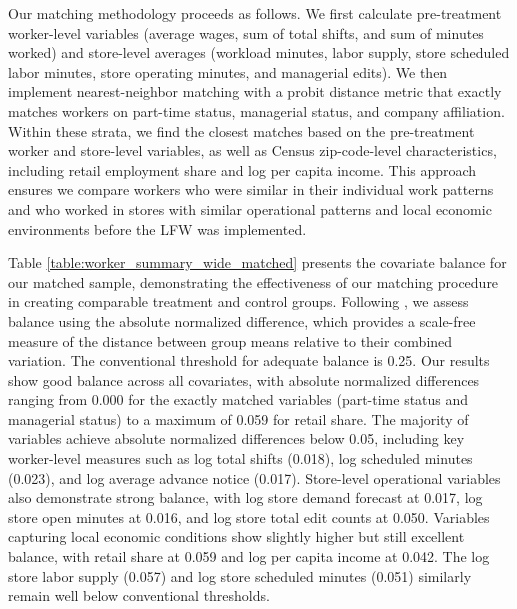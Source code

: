 \documentclass[letterpaper,11pt,leqno]{article}
\theoremstyle{paper}
\begin{document}
Our matching methodology proceeds as follows. We first calculate pre-treatment worker-level variables (average wages, sum of total shifts, and sum of minutes worked) and store-level averages (workload minutes, labor supply, store scheduled labor minutes, store operating minutes, and managerial edits). We then implement nearest-neighbor matching with a probit distance metric that exactly matches workers on part-time status, managerial status, and company affiliation. Within these strata, we find the closest matches based on the pre-treatment worker and store-level variables, as well as Census zip-code-level characteristics, including retail employment share and log per capita income. This approach ensures we compare workers who were similar in their individual work patterns and who worked in stores with similar operational patterns and local economic environments before the LFW was implemented.

Table \ref{table:worker_summary_wide_matched} presents the covariate balance for our matched sample, demonstrating the effectiveness of our matching procedure in creating comparable treatment and control groups. Following \cite{imbens2015causal}, we assess balance using the absolute normalized difference, which provides a scale-free measure of the distance between group means relative to their combined variation. The conventional threshold for adequate balance is 0.25. Our results show good balance across all covariates, with absolute normalized differences ranging from 0.000 for the exactly matched variables (part-time status and managerial status) to a maximum of 0.059 for retail share. The majority of variables achieve absolute normalized differences below 0.05, including key worker-level measures such as log total shifts (0.018), log scheduled minutes (0.023), and log average advance notice (0.017). Store-level operational variables also demonstrate strong balance, with log store demand forecast at 0.017, log store open minutes at 0.016, and log store total edit counts at 0.050. Variables capturing local economic conditions show slightly higher but still excellent balance, with retail share at 0.059 and log per capita income at 0.042. The log store labor supply (0.057) and log store scheduled minutes (0.051) similarly remain well below conventional thresholds. 
\end{document}
